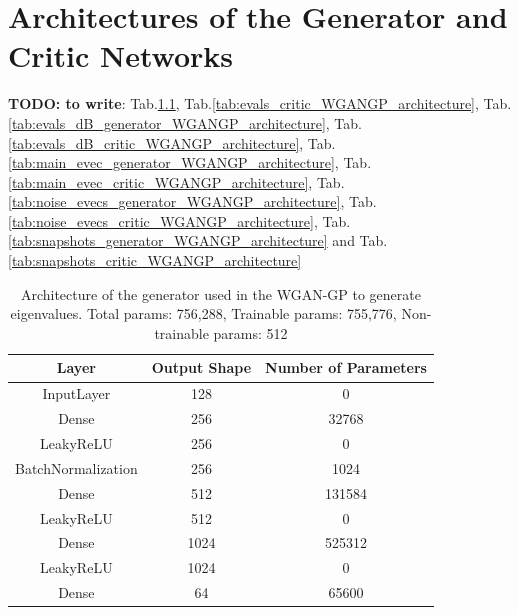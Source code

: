 \documentclass[11pt,a4paper,twoside]{report}
\begin{document}
\chapter[Architectures of the Different Networks]{Architectures of the Generator and Critic Networks}

\textbf{TODO: to write}: 
Tab.\ref{tab:evals_generator_WGANGP_architecture}, Tab.\ref{tab:evals_critic_WGANGP_architecture}, Tab.\ref{tab:evals_dB_generator_WGANGP_architecture}, Tab.\ref{tab:evals_dB_critic_WGANGP_architecture}, Tab.\ref{tab:main_evec_generator_WGANGP_architecture}, Tab.\ref{tab:main_evec_critic_WGANGP_architecture}, Tab.\ref{tab:noise_evecs_generator_WGANGP_architecture}, Tab.\ref{tab:noise_evecs_critic_WGANGP_architecture}, Tab.\ref{tab:snapshots_generator_WGANGP_architecture} and Tab.\ref{tab:snapshots_critic_WGANGP_architecture}


\begin{table}[]
  \centering
  \begin{tabular}{c c c}
      \hline
      \textbf{Layer} & \textbf{Output Shape} & \textbf{Number of Parameters} \\ \hline
      InputLayer            & 128           & 0                 \\ 
      Dense                 & 256           & 32768             \\ 
      LeakyReLU             & 256           & 0                 \\ 
      BatchNormalization    & 256           & 1024              \\ 
      Dense                 & 512           & 131584            \\ 
      LeakyReLU             & 512           & 0                 \\ 
      Dense                 & 1024          & 525312            \\ 
      LeakyReLU             & 1024          & 0                 \\ 
      Dense                 & 64            & 65600             \\ 
      \end{tabular}
  \caption{Architecture of the generator used in the WGAN-GP to generate eigenvalues. Total params: 756,288, Trainable params: 755,776, Non-trainable params: 512}
  \label{tab:evals_generator_WGANGP_architecture}
\end{table}
\end{document}
